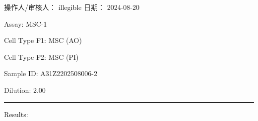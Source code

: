 \documentclass[UTF8,10pt,a4paper,fontset=fandol]{ctexart}
\newcommand{\fieldvalue}[1]{#1}
\newcommand{\handwritten}[1]{#1}
\begin{document}
\vfill

\noindent 操作人/审核人：
\fieldvalue{\handwritten{illegible}}
\hfill
日期：
\fieldvalue{\handwritten{2024-08-20}}

\newpage

\noindent
Assay: \fieldvalue{MSC-1}

\vspace{0.5em}

\noindent
Cell Type F1: \fieldvalue{MSC (AO)}

\noindent
Cell Type F2: \fieldvalue{MSC (PI)}

\vspace{0.5em}

\noindent
Sample ID: \fieldvalue{A31Z2202508006-2}

\noindent
Dilution: \fieldvalue{2.00}

\vspace{0.5em}

\noindent\rule{\linewidth}{0.4pt}

\noindent Results:

\vspace{0.5em}
\end{document}
